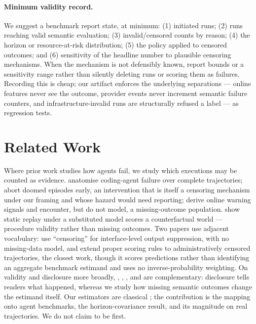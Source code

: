 \documentclass[letterpaper]{article}
\begin{document}
\paragraph{Minimum validity record.} We suggest a benchmark report state, at
minimum: (1) initiated runs; (2) runs reaching valid semantic evaluation;
(3) invalid/censored counts by reason; (4) the horizon or resource-at-risk
distribution; (5) the policy applied to censored outcomes; and (6) sensitivity
of the headline number to plausible censoring mechanisms. When the mechanism is
not defensibly known, report bounds or a sensitivity range rather than silently
deleting runs or scoring them as failures. Recording this is cheap; our artifact
enforces the underlying separations --- online features never see the outcome,
provider events never increment semantic failure counters, and
infrastructure-invalid runs are structurally refused a label --- as regression
tests.

\section{Related Work}

Where prior work studies how agents fail, we study which executions may be
counted as evidence. \citet{zhao2026failure} anatomise coding-agent failure over
complete trajectories; \citet{ruan2026doomed} abort doomed episodes early, an
intervention that is itself a censoring mechanism under our framing and whose
hazard would need reporting; \citet{li2026early} derive online warning signals
and encounter, but do not model, a missing-outcome population.
\citet{gonuguntla2026replay} show static replay under a substituted model scores
a counterfactual world --- procedure validity rather than missing outcomes. Two
papers use adjacent vocabulary: \citet{wang2026interface} use ``censoring'' for
interface-level output suppression, with no missing-data model, and
\citet{raghu2026proper} extend proper scoring rules to administratively censored
trajectories, the closest work, though it scores predictions rather than
identifying an aggregate benchmark estimand and uses no inverse-probability
weighting. On validity and disclosure more broadly,
\citet{kapoor2024agentsthatmatter}, \citet{weidinger2025evalscience},
\citet{zhu2026guardrails}, \citet{chen2026judge} and \citet{moghadasi2026disclose}
are complementary: disclosure tells readers what happened, whereas we study how
missing semantic outcomes change the estimand itself. Our estimators are
classical \citep{horvitz1952generalization,robins1994estimation,manski1990nonparametric};
the contribution is the mapping onto agent benchmarks, the horizon-covariance
result, and its magnitude on real trajectories. We do not claim to be first.
\end{document}
